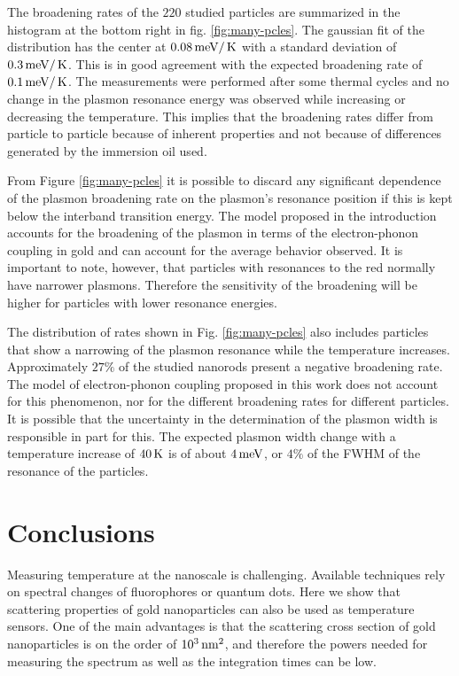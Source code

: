 The broadening rates of the $220$ studied particles are summarized in the
histogram at the bottom right in fig. \ref{fig:many-pcles}. The gaussian fit of
the distribution has the center at $0.08 \,\textrm{meV}/\,\textrm{K}$ with a standard deviation of
$0.3 \,\textrm{meV}/\,\textrm{K}$. This is in good agreement with the expected broadening rate of
$0.1\,\textrm{meV}/\,\textrm{K}$. The measurements were performed after some thermal cycles and no
change in the plasmon resonance energy was observed while increasing or
decreasing the temperature. This implies that the broadening rates differ from
particle to particle because of inherent properties and not because of
differences generated by the immersion oil used. 

From Figure \ref{fig:many-pcles} it is possible to discard any significant
dependence of the plasmon broadening rate on the plasmon's resonance position if
this is kept below the interband transition energy. The model proposed in the
introduction accounts for the broadening of the plasmon in terms of the
electron-phonon coupling in gold and can account for the average behavior
observed. It is important to note, however, that particles with resonances to
the red normally have narrower plasmons\cite{Sonnichsen2002}. Therefore the
sensitivity of the broadening will be higher for particles with lower resonance
energies.

The distribution of rates shown in Fig. \ref{fig:many-pcles} also includes
particles that show a narrowing of the plasmon resonance while the temperature
increases. Approximately $27\%$ of the studied nanorods present a negative
broadening rate. The model of electron-phonon coupling proposed in this
work does not account for this phenomenon, nor for the different broadening
rates for different particles. It is possible that the uncertainty in the
determination of the plasmon width is responsible in part for this. The expected
plasmon width change with a temperature increase of $40\,\textrm{K}$ is of about
$4\,\textrm{meV}$, or $4\%$ of the FWHM of the resonance of the particles. 

\section{Conclusions}
Measuring temperature at the nanoscale is challenging. Available techniques rely
on spectral changes of fluorophores\cite{Chapman1995a} or quantum
dots\cite{Tanimoto2016,Yang2011a}. Here we show that scattering properties of
gold nanoparticles can also be used as temperature sensors. One of the main
advantages is that the scattering cross section of gold nanoparticles is on the
order of $10^3\,\textrm{nm}^2$, and therefore the powers needed for measuring the spectrum
as well as the integration times can be low.


